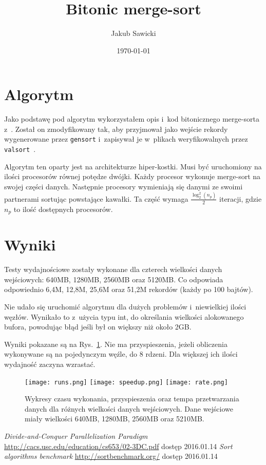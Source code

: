 \documentclass[a4paper; 12pt]{article}
\title{Bitonic merge-sort}
\author{Jakub Sawicki}
\date{\today}
\begin{document}
\renewcommand{\figurename}{Rys.}
\renewcommand{\tablename}{Tab.}
\renewcommand{\abstractname}{Abstrakt}

\maketitle

\section{Algorytm}

Jako podstawę pod algorytm wykorzystałem opis i~kod bitonicznego merge-sorta
z~\cite{parallel}.
Został on zmodyfikowany tak, aby przyjmował jako wejście rekordy wygenerowane
przez \texttt{gensort} i~zapisywał je w~plikach weryfikowalnych przez
\texttt{valsort}~\cite{sortalgo}.

Algorytm ten oparty jest na architekturze hiper-kostki.
Musi być uruchomiony na ilości procesorów równej potędze dwójki.
Każdy procesor wykonuje merge-sort na swojej części danych.
Następnie procesory wymieniają się danymi ze swoimi partnerami sortując
powstające kawałki.
Ta część wymaga $\frac{\log_2^2(n_p)}{2}$ iteracji, gdzie $n_p$ to ilość
dostępnych procesorów.


\section{Wyniki}

Testy wydajnościowe zostały wykonane dla czterech wielkości danych wejściowych:
640MB, 1280MB, 2560MB oraz 5120MB.
Co odpowiada odpowiednio 6,4M, 12,8M, 25,6M oraz 51,2M rekordów (każdy po 100
bajtów).

Nie udało się uruchomić algorytmu dla dużych problemów i~niewielkiej ilości węzłów.
Wynikało to z~użycia typu int, do określania wielkości alokowanego bufora,
powodując błąd jeśli był on większy niż około 2GB.

Wyniki pokazane są na Rys.~\ref{fig:results1}.
Nie ma przyspieszenia, jeżeli obliczenia wykonywane są na pojedynczym węźle, do
8 rdzeni.
Dla większej ich ilości wydajność zaczyna wzrastać.

\begin{figure}[p]
    \centering
    \texttt{[image: runs.png]}
    \texttt{[image: speedup.png]}
    \texttt{[image: rate.png]}
    \caption{Wykresy czasu wykonania, przyspieszenia oraz tempa przetwarzania
        danych dla różnych wielkości danych wejściowych.
        Dane wejściowe miały wielkości 640MB, 1280MB, 2560MB oraz 5210MB.}
    \label{fig:results1}
\end{figure}



\begin{thebibliography}{9}
        \emph{Divide-and-Conquer Parallelization Paradigm}
        \url{http://cacs.usc.edu/education/cs653/02-3DC.pdf} dostęp 2016.01.14
        \emph{Sort algorithms benchmark}
        \url{http://sortbenchmark.org/} dostęp 2016.01.14
\end{thebibliography}
\end{document}
